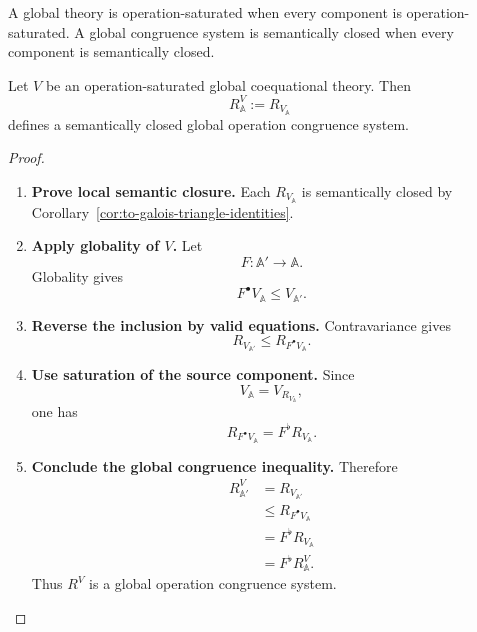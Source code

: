 A global theory is operation-saturated when every component is
operation-saturated. A global congruence system is semantically closed when
every component is semantically closed.

\begin{proposition}
\label{prop:to-global-V-to-R}
    Let \(V\) be an operation-saturated global coequational theory. Then
    \[
        R^V_{\mathbb A}
        :=
        R_{V_{\mathbb A}}
    \]
    defines a semantically closed global operation congruence system.
\end{proposition}

\begin{proof}
    \leavevmode
    \begin{enumerate}
        \item \textbf{Prove local semantic closure.}
        Each \(R_{V_{\mathbb A}}\) is semantically closed by
        Corollary~\ref{cor:to-galois-triangle-identities}.

        \item \textbf{Apply globality of \(V\).}
        Let
        \[
            F:\mathbb A'\to\mathbb A.
        \]
        Globality gives
        \[
            F^\bullet V_{\mathbb A}
            \leq
            V_{\mathbb A'}.
        \]

        \item \textbf{Reverse the inclusion by valid equations.}
        Contravariance gives
        \[
            R_{V_{\mathbb A'}}
            \leq
            R_{F^\bullet V_{\mathbb A}}.
        \]

        \item \textbf{Use saturation of the source component.}
        Since
        \[
            V_{\mathbb A}
            =
            V_{R_{V_{\mathbb A}}},
        \]
        one has
        \[
            R_{F^\bullet V_{\mathbb A}}
            =
            F^\flat R_{V_{\mathbb A}}.
        \]

        \item \textbf{Conclude the global congruence inequality.}
        Therefore
        \[
        \begin{aligned}
            R^V_{\mathbb A'}
            &=
            R_{V_{\mathbb A'}}
            \\
            &\leq
            R_{F^\bullet V_{\mathbb A}}
            \\
            &=
            F^\flat R_{V_{\mathbb A}}
            \\
            &=
            F^\flat R^V_{\mathbb A}.
        \end{aligned}
        \]
        Thus \(R^V\) is a global operation congruence system.
    \end{enumerate}
\end{proof}

